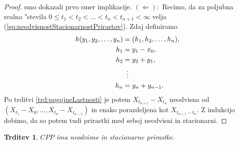 \documentclass[12pt, a4paper, reqno]{amsart}
\theoremstyle{definition}
\theoremstyle{plain}
\newtheorem{trditev}[definicija]{Trditev}
\newcommand{\1}{\mathds{1}}
\newcommand*{\refPriloga}[1]{%
  \begingroup
    \hypersetup{
      linkcolor=red,
      linkbordercolor=red,
    }%
    \ref{#1}%
  \endgroup
}
\begin{document}
\begin{proof}
            smo dokazali prvo smer implikacije. \newline
            \noindent
            $(\Leftarrow):$ Recimo, da za poljubna realna "stevila $0\leq t_1 < t_2 < \ldots < t_n < t_{n+1} < \infty$ velja
            (\ref{eq:neodvisnostStacionarnostPrirastov}). Zdaj definiramo 
            \begin{align*}
                h(y_1, y_2, \dots, y_n) &= (h_1, h_2, \dots, h_n),\\
                                    h_1 &= y_1 - x_0, \\
                                    h_2 &= y_2 + y_1, \\
                                    &\mathrel{\makebox[\widthof{=}]{\vdots}} \\
                                    h_n &= y_n + y_{n-1}. 
            \end{align*}  
            Po trditvi \refPriloga{trd:pogojneLastnosti} je potem $X_{t_{n+1}} - X_{t_n}$ neodvisna od
            $(X_{t_1} - X_0, \dots, X_{t_n} - X_{t_{n-1}})$ in enako porazdeljena kot $X_{t_{n+1} - t_n}$.
            Z indukcijo dobimo, da so potem tudi prirastki med seboj neodvisni in stacionarni.     
            
        \end{proof}

        \begin{trditev}
            $CPP$ ima neodvisne in stacionarne prirastke.
            \label{trd:neodvPrirCPP}
        \end{trditev}
\end{document}
